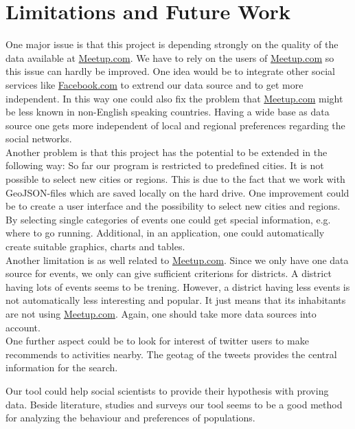\section{Limitations and Future Work}\label{sec:limitationsandfuturework}

One major issue is that this project is depending strongly on the quality of the data available at \url{Meetup.com}. We have to rely on the users of \url{Meetup.com} so this issue can hardly be improved. One idea would be to integrate other social services like \url{Facebook.com} to extrend our data source and to get more independent. In this way one could also fix the problem that \url{Meetup.com} might be less known in non-English speaking countries. Having a wide base as data source one gets more independent of local and regional preferences regarding the social networks.\\Another problem is that this project has the potential to be extended in the following way: So far our program is restricted to predefined cities. It is not possible to select new cities or regions. This is due to the fact that we work with GeoJSON-files which are saved locally on the hard drive. One improvement could be to create a user interface and the possibility to select new cities and regions. By selecting single categories of events one could get special information, e.g. where to go running. Additional, in an application, one could automatically create suitable graphics, charts and tables.\\Another limitation is as well related to \url{Meetup.com}. Since we only have one data source for events, we only can give sufficient criterions for districts. A district having lots of events seems to be trening. However, a district having less events is not automatically less interesting and popular. It just means that its inhabitants are not using \url{Meetup.com}. Again, one should take more data sources into account.\\One further aspect could be to look for interest of twitter users to make recommends to activities nearby. The geotag of the tweets provides the central information for the search.

Our tool could help social scientists to provide their hypothesis with proving data. Beside literature, studies and surveys our tool seems to be a good method for analyzing the behaviour and preferences of populations.